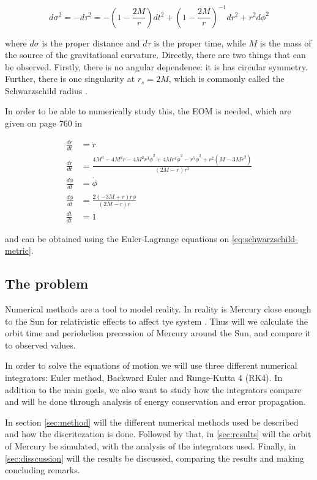 \begin{equation}\label{eq:schwarzschild-metric}
	d\sigma^2 = -d\tau^2 = - \left( 1 - \frac{2M}{r}\right)dt^2 + \left(1 - \frac{2M}{r}\right)^{-1} dr^2 + r^2 d\phi^2
\end{equation}

where $d\sigma$ is the proper distance and $d\tau$ is the proper time, while $M$ is the mass of the source of the gravitational curvature. Directly, there are two things that can be observed. Firstly, there is no angular dependence: it is has circular symmetry. Further, there is one singularity at $r_s = 2M$, which is commonly called the Schwarzschild radius \cite{guidry_2019}. 

In order to be able to numerically study this, the EOM is needed, which are given on page 760 in \cite{gould_2007}

\begin{align}\label{eq:eoms}
      		\frac{dr}{dt} &= \dot{r} \\
	\frac{d\dot{r}}{dt} &= \frac{4 M^3-4 M^2 r-4 M^2 r^3 \dot{\phi}^2+4 M r^4 \dot{\phi}^2-r^5 \dot{\phi}^2+r^2\left(M-3 M \dot{r}^2\right)}{(2 M-r) r^3} \\
	\frac{d\phi}{dt} &= \dot{\phi} \\
	\frac{d\dot{\phi}}{dt} &= \frac{2(-3M + r)\dot{r}\dot{\phi}}{(2M - r)r} \\
	\frac{dt}{dt} &= 1
\end{align}

and can be obtained using the Euler-Lagrange equations on \eqref{eq:schwarzschild-metric}. 

\subsection{The problem}
Numerical methods are a tool to model reality. In reality is Mercury close enough to the Sun for relativistic effects to affect tye system \cite{wiki_precession}. Thus will we calculate the orbit time and periohelion precession of Mercury around the Sun, and compare it to observed values.  

In order to solve the equations of motion we will use three different numerical integrators: Euler method, Backward Euler and Runge-Kutta 4 (RK4). In addition to the main goals, we also want to study how the integrators compare and will be done through analysis of energy conservation and error propagation.

In section \ref{sec:method} will the different numerical methods used be described and how the discritezation is done. Followed by that, in \ref{sec:results} will the orbit of Mercury be simulated, with the analysis of the integrators used.  Finally, in \ref{sec:disscussion} will the results be discussed, comparing the results and making concluding remarks. 


